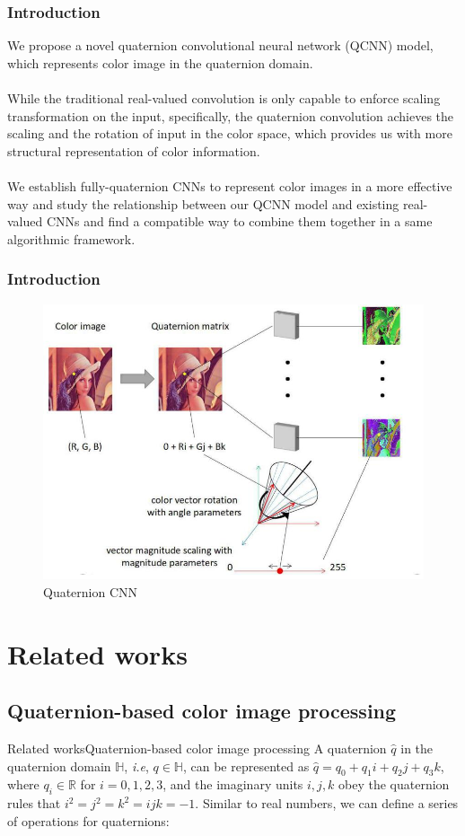 \documentclass{beamer}
\begin{document}
\begin{frame}
    \frametitle{Introduction}

    We propose a novel quaternion convolutional neural network (QCNN) model, which represents color image in the quaternion domain.
    \\~\\
    While the traditional real-valued convolution is only capable to enforce scaling transformation on the input, specifically, the quaternion convolution achieves the scaling and the rotation of input in the color space, which provides us with more structural representation of color information.
    \\~\\
    We establish fully-quaternion CNNs to represent color images in a more effective way and study the relationship between our QCNN model and existing real-valued CNNs and find a compatible way to combine them together in a same algorithmic framework.
\end{frame}

\begin{frame}
    \frametitle{Introduction}
    \begin{figure}[H]
        \centering
        \includegraphics[width=.7\textwidth]{img/pic2.jpg}
        \caption{Quaternion CNN}
    \end{figure}
\end{frame}

\section{Related works}
\subsection{Quaternion-based color image processing}
\begin{frame}{Related works}{Quaternion-based color image processing}
    A quaternion $\hat{q}$ in the quaternion domain $\mathbb{H}$, \emph{i.e}, $q\in \mathbb{H}$, can be represented as $\hat{q}=q_0+q_1i+q_2j+q_3k$, where $q_i\in \mathbb{R}$ for $i=0,1,2,3$, and the imaginary units $i,j,k$ obey the quaternion rules that $i^2=j^2=k^2=ijk=-1$. Similar to real numbers, we can define a series of operations for quaternions:
\end{frame}
\end{document}
